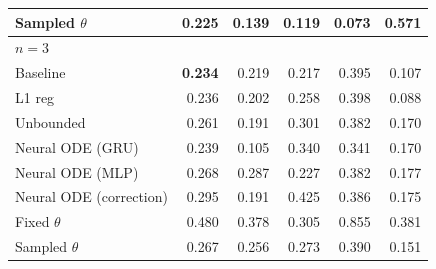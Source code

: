 \begin{tabular}{lrrrrr}
Sampled $\theta$ & 0.225 & 0.139 & 0.119 & 0.073 & 0.571 \\
\midrule
\multicolumn{6}{l}{\textbf{$n=3$}} \\
Baseline & \textbf{0.234} & 0.219 & 0.217 & 0.395 & 0.107 \\
L1 reg & 0.236 & 0.202 & 0.258 & 0.398 & 0.088 \\
Unbounded & 0.261 & 0.191 & 0.301 & 0.382 & 0.170 \\
Neural ODE (GRU) & 0.239 & 0.105 & 0.340 & 0.341 & 0.170 \\
Neural ODE (MLP) & 0.268 & 0.287 & 0.227 & 0.382 & 0.177 \\
Neural ODE (correction) & 0.295 & 0.191 & 0.425 & 0.386 & 0.175 \\
Fixed $\theta$ & 0.480 & 0.378 & 0.305 & 0.855 & 0.381 \\
Sampled $\theta$ & 0.267 & 0.256 & 0.273 & 0.390 & 0.151 \\
\bottomrule
\end{tabular}
